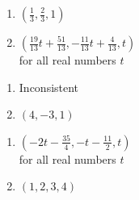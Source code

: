 \begin{multicols}{2}
\begin{enumerate}
\setcounter{enumi}{\value{HW}}



\item  $\left(\frac{1}{3},\frac{2}{3},1\right)$
\item  $\left(\frac{19}{13} t + \frac{51}{13},-\frac{11}{13} t+\frac{4}{13},t\right)$\\
for all real numbers $t$

\setcounter{HW}{\value{enumi}}
\end{enumerate}
\end{multicols}


\begin{multicols}{2}
\begin{enumerate}
\setcounter{enumi}{\value{HW}}

\item Inconsistent
\item $\left(4,-3,1\right)$

\setcounter{HW}{\value{enumi}}
\end{enumerate}
\end{multicols}


\begin{multicols}{2}
\begin{enumerate}
\setcounter{enumi}{\value{HW}}


\item $\left(-2t - \frac{35}{4},-t - \frac{11}{2},t\right)$\\
for all real numbers $t$
\item $(1, 2, 3, 4)$

\setcounter{HW}{\value{enumi}}
\end{enumerate}
\end{multicols}

